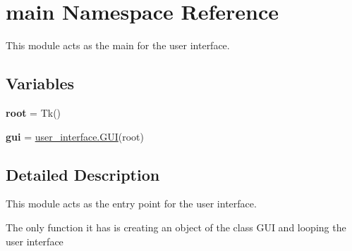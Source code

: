 \hypertarget{namespacemain}{}\section{main Namespace Reference}
\label{namespacemain}


This module acts as the main for the user interface.  


\subsection*{Variables}
\begin{DoxyCompactItemize}
\item 
\mbox{\label{namespacemain_aa698d1260ba54f169d55a5630f0f0aa3}} 
{\bfseries root} = Tk()
\item 
\mbox{\label{namespacemain_a361ebd575072b82410aaa1adc5024a76}} 
{\bfseries gui} = \hyperlink{classuser__interface_1_1GUI}{user\+\_\+interface.\+G\+UI}(root)
\end{DoxyCompactItemize}


\subsection{Detailed Description}
This module acts as the entry point for the user interface. 

The only function it has is creating an object of the class GUI and looping the user interface 
